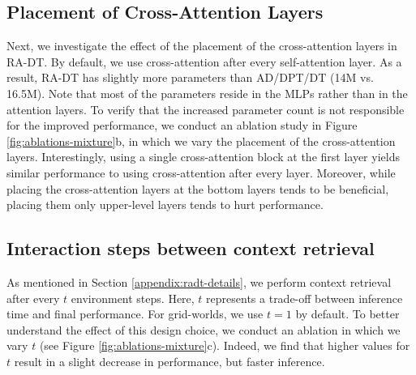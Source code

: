 \documentclass{article}
\begin{document}
\subsection{Placement of Cross-Attention Layers}\label{appendix:ca-layer-placement}
Next, we investigate the effect of the placement of the cross-attention layers in RA-DT.
By default, we use cross-attention after every self-attention layer.
As a result, RA-DT has slightly more parameters than AD/DPT/DT (14M vs. 16.5M).
Note that most of the parameters reside in the MLPs rather than in the attention layers.
To verify that the increased parameter count is not responsible for the improved performance, we conduct an ablation study in Figure \ref{fig:ablations-mixture}b, in which we vary the placement of the cross-attention layers.
Interestingly, using a single cross-attention block at the first layer yields similar performance to using cross-attention after every layer.
Moreover, while placing the cross-attention layers at the bottom layers tends to be beneficial, placing them only upper-level layers tends to hurt performance.
\subsection{Interaction steps between context retrieval}\label{appendix:steps-between-retrievals}
As mentioned in Section \ref{appendix:radt-details}, we perform context retrieval after every $t$ environment steps.
Here, $t$ represents a trade-off between inference time and final performance.
For grid-worlds, we use $t=1$ by default.
To better understand the effect of this design choice, we conduct an ablation in which we vary $t$ (see Figure \ref{fig:ablations-mixture}c).
Indeed, we find that higher values for $t$ result in a slight decrease in performance, but faster inference.
\end{document}
